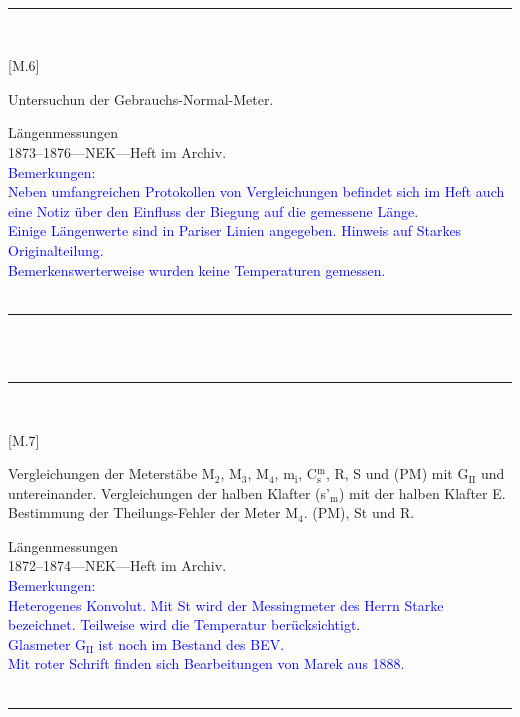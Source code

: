 \vspace*{-2.5pt}\\
\parbox{\textwidth}{%
\rule{\textwidth}{1pt}\vspace*{-3mm}\\
\begin{minipage}[t]{0.2\textwidth}\vspace{0pt}
\Huge\rule[-4mm]{0cm}{1cm}[M.6]
\end{minipage}
\hfill
\begin{minipage}[t]{0.8\textwidth}\vspace{0pt}
\large Untersuchun der Gebrauchs-Normal-Meter.\rule[-2mm]{0mm}{2mm}
\end{minipage}
{\footnotesize\flushright
Längenmessungen\\
}
1873--1876\quad---\quad NEK\quad---\quad Heft im Archiv.\\
\textcolor{blue}{Bemerkungen:\\{}
Neben umfangreichen Protokollen von Vergleichungen befindet sich im Heft auch eine Notiz über den Einfluss der Biegung auf die gemessene Länge.\\{}
Einige Längenwerte sind in Pariser Linien angegeben. Hinweis auf {\glqq}Starkes Originalteilung{\grqq}.\\{}
Bemerkenswerterweise wurden keine Temperaturen gemessen.\\{}
}
\\[-15pt]
\rule{\textwidth}{1pt}
}
\\
\vspace*{-2.5pt}\\
\parbox{\textwidth}{%
\rule{\textwidth}{1pt}\vspace*{-3mm}\\
\begin{minipage}[t]{0.2\textwidth}\vspace{0pt}
\Huge\rule[-4mm]{0cm}{1cm}[M.7]
\end{minipage}
\hfill
\begin{minipage}[t]{0.8\textwidth}\vspace{0pt}
\large Vergleichungen der Meterstäbe M$_\mathrm{2}$, M$_\mathrm{3}$, M$_\mathrm{4}$, m$_\mathrm{i}$, C$^\mathrm{m}_\mathrm{s}$, R, S und (PM) mit G$_\mathrm{II}$ und untereinander. Vergleichungen der halben Klafter (s'$_\mathrm{m}$) mit der halben Klafter E. Bestimmung der Theilungs-Fehler der Meter M$_\mathrm{4}$. (PM), St und R.\rule[-2mm]{0mm}{2mm}
\end{minipage}
{\footnotesize\flushright
Längenmessungen\\
}
1872--1874\quad---\quad NEK\quad---\quad Heft im Archiv.\\
\textcolor{blue}{Bemerkungen:\\{}
Heterogenes Konvolut. Mit St wird der {\glqq}Messingmeter des Herrn Starke{\grqq} bezeichnet. Teilweise wird die Temperatur berücksichtigt.\\{}
Glasmeter G$_\mathrm{II}$ ist noch im Bestand des BEV.\\{}
Mit roter Schrift finden sich Bearbeitungen von Marek aus 1888.\\{}
}
\\[-15pt]
\rule{\textwidth}{1pt}
}
